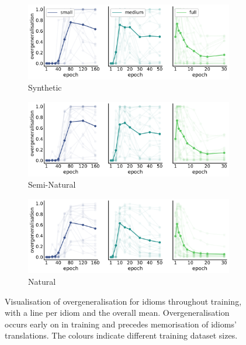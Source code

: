 \begin{figure}
    \centering
    \begin{subfigure}[b]{\columnwidth}\centering
    \includegraphics[width=\textwidth]{figures/global_compositionality/synthetic.pdf}
    \caption{Synthetic}
    \end{subfigure}
    \begin{subfigure}[b]{\columnwidth}\centering
    \includegraphics[width=\textwidth]{figures/global_compositionality/semi_natural.pdf}
    \caption{Semi-Natural}
    \end{subfigure}
    \begin{subfigure}[b]{\columnwidth}\centering
    \includegraphics[width=\textwidth]{figures/global_compositionality/natural.pdf}
    \caption{Natural}
    \end{subfigure}
    \caption{Visualisation of overgeneralisation for idioms throughout training, with a line per idiom and the overall mean. Overgeneralisation occurs early on in training and precedes memorisation of idioms' translations.
    The colours indicate different training dataset sizes.}
    \label{fig:global_compositionality}
    \vspace{-0.3cm}
\end{figure}

